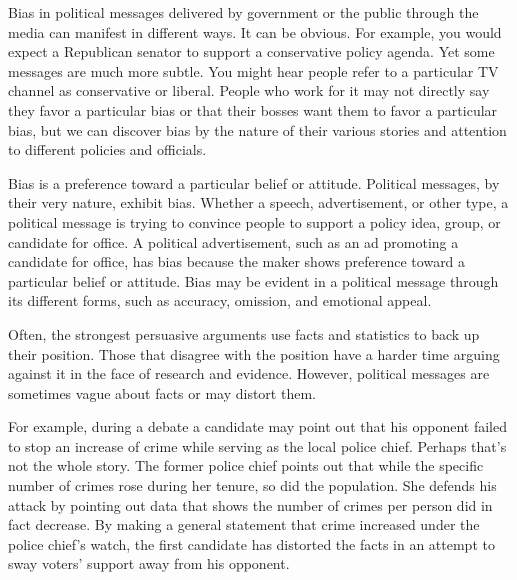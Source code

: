 Bias in political messages delivered by government or the public through the media can manifest in different ways. It can be obvious. For example, you would expect a Republican senator to support a conservative policy agenda. Yet some messages are much more subtle. You might hear people refer to a particular TV channel as conservative or liberal. People who work for it may not directly say they favor a particular bias or that their bosses want them to favor a particular bias, but we can discover bias by the nature of their various stories and attention to different policies and officials.

\begin{definition}[Bias]
    Bias is a preference toward a particular belief or attitude. Political messages, by their very nature, exhibit bias. Whether a speech, advertisement, or other type, a political message is trying to convince people to support a policy idea, group, or candidate for office. A political advertisement, such as an ad promoting a candidate for office, has bias because the maker shows preference toward a particular belief or attitude. Bias may be evident in a political message through its different forms, such as accuracy, omission, and emotional appeal.
\end{definition}

\begin{definition}
    Often, the strongest persuasive arguments use facts and statistics to back up their position. Those that disagree with the position have a harder time arguing against it in the face of research and evidence. However, political messages are sometimes vague about facts or may distort them.
    
    For example, during a debate a candidate may point out that his opponent failed to stop an increase of crime while serving as the local police chief. Perhaps that's not the whole story. The former police chief points out that while the specific number of crimes rose during her tenure, so did the population. She defends his attack by pointing out data that shows the number of crimes per person did in fact decrease. By making a general statement that crime increased under the police chief's watch, the first candidate has distorted the facts in an attempt to sway voters' support away from his opponent.
\end{definition}

